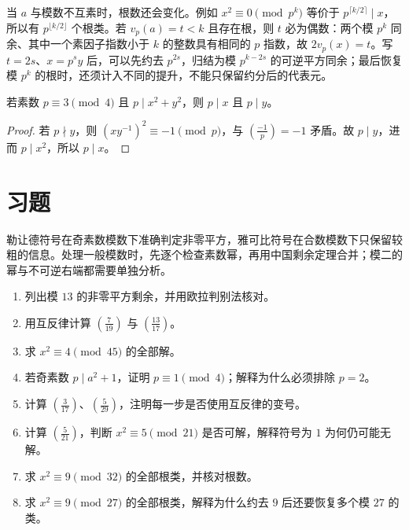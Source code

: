 \documentclass[UTF8,12pt,a4paper,fontset=fandol]{ctexbook}
\begin{document}
当 $a$ 与模数不互素时，根数还会变化。例如 $x^2\equiv0\pmod{p^k}$ 等价于 $p^{\lceil k/2\rceil}\mid x$，所以有 $p^{\lfloor k/2\rfloor}$ 个根类。若 $v_p(a)=t<k$ 且存在根，则 $t$ 必为偶数：两个模 $p^k$ 同余、其中一个素因子指数小于 $k$ 的整数具有相同的 $p$ 指数，故 $2v_p(x)=t$。写 $t=2s$、$x=p^sy$ 后，可以先约去 $p^{2s}$，归结为模 $p^{k-2s}$ 的可逆平方同余；最后恢复模 $p^k$ 的根时，还须计入不同的提升，不能只保留约分后的代表元。

\begin{corollary}
\label{cor:prime-three-mod-four}
若素数 $p\equiv3\pmod4$ 且 $p\mid x^2+y^2$，则 $p\mid x$ 且 $p\mid y$。
\end{corollary}
\begin{proof}
若 $p\nmid y$，则 $(xy^{-1})^2\equiv-1\pmod p$，与 $\left(\frac{-1}p\right)=-1$ 矛盾。故 $p\mid y$，进而 $p\mid x^2$，所以 $p\mid x$。
\end{proof}

\section{习题}

勒让德符号在奇素数模数下准确判定非零平方，雅可比符号在合数模数下只保留较粗的信息。处理一般模数时，先逐个检查素数幂，再用中国剩余定理合并；模二的幂与不可逆右端都需要单独分析。

\begin{enumerate}
 \item 列出模 $13$ 的非零平方剩余，并用欧拉判别法核对。
 \item 用互反律计算 $\left(\frac7{19}\right)$ 与 $\left(\frac{13}{17}\right)$。
 \item 求 $x^2\equiv4\pmod{45}$ 的全部解。
 \item 若奇素数 $p\mid a^2+1$，证明 $p\equiv1\pmod4$；解释为什么必须排除 $p=2$。
 \item\label{ex:quadratic-sign} 计算 $\left(\frac3{17}\right)$、$\left(\frac5{29}\right)$，注明每一步是否使用互反律的变号。
 \item\label{ex:quadratic-jacobi} 计算 $\left(\frac5{21}\right)$，判断 $x^2\equiv5\pmod{21}$ 是否可解，解释符号为 $1$ 为何仍可能无解。
 \item\label{ex:quadratic-two-power} 求 $x^2\equiv9\pmod{32}$ 的全部根类，并核对根数。
 \item\label{ex:quadratic-valuation} 求 $x^2\equiv9\pmod{27}$ 的全部根类，解释为什么约去 $9$ 后还要恢复多个模 $27$ 的类。
\end{enumerate}
\end{document}
